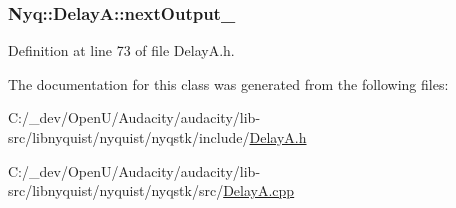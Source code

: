 \subsubsection[{\texorpdfstring{next\+Output\+\_\+}{nextOutput_}}]{ Nyq\+::\+Delay\+A\+::next\+Output\+\_\+\hspace{0.3cm}{\ttfamily [protected]}}\hypertarget{class_nyq_1_1_delay_a_a047ba30ea8d274c0fd1b16d92bfe750f}{}\label{class_nyq_1_1_delay_a_a047ba30ea8d274c0fd1b16d92bfe750f}


Definition at line 73 of file Delay\+A.\+h.



The documentation for this class was generated from the following files\+:\begin{DoxyCompactItemize}
\item 
C\+:/\+\_\+dev/\+Open\+U/\+Audacity/audacity/lib-\/src/libnyquist/nyquist/nyqstk/include/\hyperlink{_delay_a_8h}{Delay\+A.\+h}\item 
C\+:/\+\_\+dev/\+Open\+U/\+Audacity/audacity/lib-\/src/libnyquist/nyquist/nyqstk/src/\hyperlink{_delay_a_8cpp}{Delay\+A.\+cpp}\end{DoxyCompactItemize}
